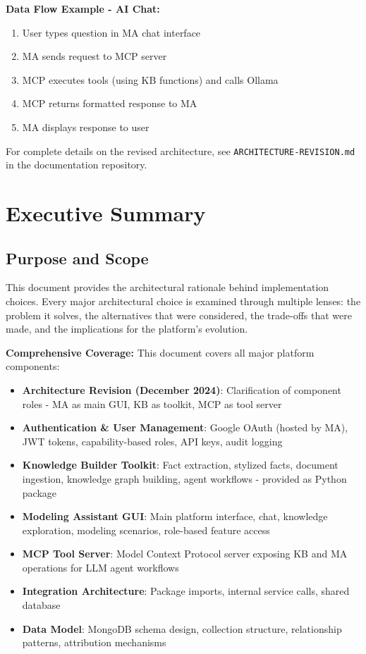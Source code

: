\documentclass[12pt,a4paper]{article}
\begin{document}
\textbf{Data Flow Example - AI Chat:}
\begin{enumerate}[noitemsep]
    \item User types question in MA chat interface
    \item MA sends request to MCP server
    \item MCP executes tools (using KB functions) and calls Ollama
    \item MCP returns formatted response to MA
    \item MA displays response to user
\end{enumerate}

For complete details on the revised architecture, see \texttt{ARCHITECTURE-REVISION.md} in the documentation repository.

\section{Executive Summary}

\subsection{Purpose and Scope}

This document provides the architectural rationale behind implementation choices. Every major architectural choice is examined through multiple lenses: the problem it solves, the alternatives that were considered, the trade-offs that were made, and the implications for the platform's evolution.

\textbf{Comprehensive Coverage:} This document covers all major platform components:

\begin{itemize}[leftmargin=*]
    \item \textbf{Architecture Revision (December 2024)}: Clarification of component roles - MA as main GUI, KB as toolkit, MCP as tool server
    \item \textbf{Authentication \& User Management}: Google OAuth (hosted by MA), JWT tokens, capability-based roles, API keys, audit logging
    \item \textbf{Knowledge Builder Toolkit}: Fact extraction, stylized facts, document ingestion, knowledge graph building, agent workflows - provided as Python package
    \item \textbf{Modeling Assistant GUI}: Main platform interface, chat, knowledge exploration, modeling scenarios, role-based feature access
    \item \textbf{MCP Tool Server}: Model Context Protocol server exposing KB and MA operations for LLM agent workflows
    \item \textbf{Integration Architecture}: Package imports, internal service calls, shared database
    \item \textbf{Data Model}: MongoDB schema design, collection structure, relationship patterns, attribution mechanisms
\end{itemize}
\end{document}
